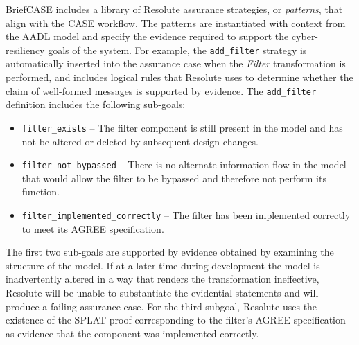 BriefCASE includes a library of Resolute assurance strategies, or \emph{patterns}, that align with
the CASE workflow. The patterns are instantiated with context from the AADL model and specify the
evidence required to support the cyber-resiliency goals of the system. For example, the
\texttt{add\_filter} strategy is automatically inserted into the assurance case when the
\textit{Filter} transformation is performed, and includes logical rules that Resolute uses to
determine whether the claim of well-formed messages is supported by evidence. The \texttt{add\_filter}
definition 
includes the following sub-goals:
\begin{itemize} 
\item \texttt{filter\_exists} -- The filter component is still present in the model and has not be 
altered or deleted by subsequent design changes. 
\item \texttt{filter\_not\_bypassed} -- There is no alternate information flow in the model that 
would allow the filter to be bypassed and therefore not perform its function.   
\item \texttt{filter\_implemented\_correctly} -- The filter has been implemented correctly 
to meet its AGREE specification.  
\end{itemize}

The first two sub-goals are supported by evidence obtained by examining the structure of the model. 
If at a later time during development the model is inadvertently altered in a way that renders the transformation
ineffective, Resolute will be unable to substantiate the evidential statements and will
produce a failing assurance case.
%
For the third subgoal, Resolute uses the existence of the
SPLAT proof corresponding to the filter's AGREE specification
as evidence that the component was implemented correctly.





